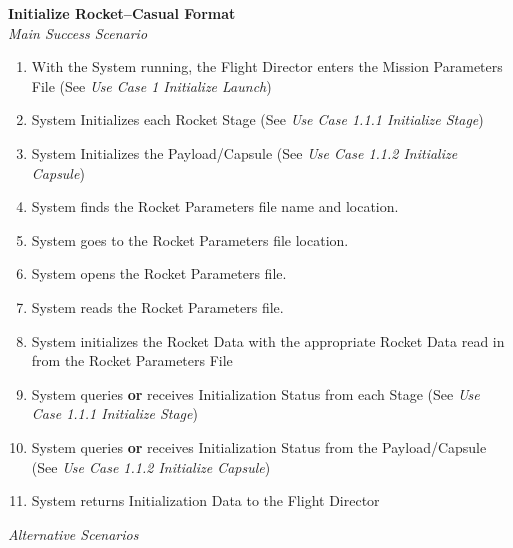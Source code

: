 \documentclass[letterpaper]{article}
\begin{document}
\noindent
\textbf{Initialize Rocket--Casual Format}\\
\textit{Main Success Scenario}\\
\begin{enumerate}
   \item With the System running, the Flight Director enters the
      Mission Parameters File (See 
      \textit{Use Case 1 Initialize Launch})
   \item System Initializes each Rocket Stage (See 
      \textit{Use Case 1.1.1 Initialize Stage})
   \item System Initializes the Payload/Capsule (See 
      \textit{Use Case 1.1.2 Initialize Capsule})
   \item System finds the Rocket Parameters file name and location.
   \item System goes to the Rocket Parameters file location.
   \item System opens the Rocket Parameters file.
   \item System reads the Rocket Parameters file.
   \item System initializes the Rocket Data with the appropriate
      Rocket Data read in from the Rocket Parameters File
   \item System queries \textbf{or} receives Initialization Status
      from each Stage (See 
      \textit{Use Case 1.1.1 Initialize Stage})
   \item System queries \textbf{or} receives Initialization Status 
      from the Payload/Capsule (See 
      \textit{Use Case 1.1.2 Initialize Capsule})
   \item System returns Initialization Data to the Flight Director
\end{enumerate}
\textit{Alternative Scenarios}
\end{document}
